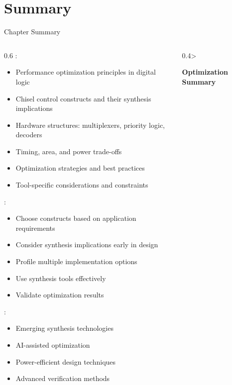 \section{Summary}

\begin{frame}{Chapter Summary}
\begin{columns}
\begin{column}{0.6\textwidth}
:
\begin{itemize}
\item Performance optimization principles in digital logic
\item Chisel control constructs and their synthesis implications
\item Hardware structures: multiplexers, priority logic, decoders
\item Timing, area, and power trade-offs
\item Optimization strategies and best practices
\item Tool-specific considerations and constraints
\end{itemize}

\vspace{0.3cm}
:
\begin{itemize}
\item Choose constructs based on application requirements
\item Consider synthesis implications early in design
\item Profile multiple implementation options
\item Use synthesis tools effectively
\item Validate optimization results
\end{itemize}

\vspace{0.3cm}
:
\begin{itemize}
\item Emerging synthesis technologies
\item AI-assisted optimization
\item Power-efficient design techniques
\item Advanced verification methods
\end{itemize}
\end{column}
\begin{column}{0.4\textwidth>
\begin{center}
\textbf{Optimization Summary}
\vspace{0.3cm}


\end{center}}
\end{column}
\end{columns}
\end{frame}
